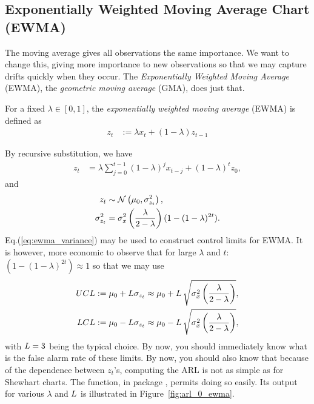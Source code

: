 \subsection{Exponentially Weighted Moving Average Chart (EWMA)}
The moving average gives all observations the same importance. 
We want to change this, giving more importance to new observations so that we may capture drifts quickly when they occur. 
The \emph{Exponentially Weighted Moving Average} (EWMA), \aka the \emph{geometric moving average} (GMA), does just that. 
\begin{definition}[EWMA]
For a fixed $\lambda \in [0,1]$, the \emph{exponentially weighted moving average} (EWMA) is defined as 
\begin{align}
	z_t &:= \lambda x_t + (1-\lambda) z_{t-1}
\end{align}
\end{definition}
By recursive substitution, we have 
\begin{align}
	z_t &= \lambda \sum_{j=0}^{t-1} (1-\lambda)^j x_{t-j} + (1-\lambda)^t z_0,
\end{align}
and 
\begin{align}
\label{eq:ewma_variance}
	z_t &\sim \mathcal{N}\left(\mu_0,	\sigma^2_{z_t} \right), \\
	\sigma^2_{z_t} &= \sigma^2_x \left( \frac{\lambda}{2-\lambda} \right)(1-(1-\lambda)^{2t}).
\end{align}
Eq.(\ref{eq:ewma_variance}) may be used to construct control limits for EWMA.
It is however, more economic to observe that for large $\lambda$ and $t$: $(1-(1-\lambda)^{2t}) \approx 1$ so that we may use 
\begin{align}
\begin{split}
\label{eq:ewma_variance_approximate}
	UCL &:= \mu_0 + L \sigma_{z_t} \approx \mu_0 + L \, \sqrt{\sigma^2_x\left( \frac{\lambda}{2-\lambda} \right)},  \\
	LCL &:= \mu_0 - L \sigma_{z_t} \approx \mu_0 - L \, \sqrt{\sigma^2_x\left( \frac{\lambda}{2-\lambda} \right)},
\end{split}
\end{align}
with $L=3$ being the typical choice.
By now, you should immediately know what is the false alarm rate of these limits.
By now, you should also know that because of the dependence between $z_t$'s, computing the ARL is not as simple as for Shewhart charts. The  \R function, in package , permits doing so easily. 
Its output for various $\lambda$ and $L$ is illustrated in Figure~\ref{fig:arl_0_ewma}.

